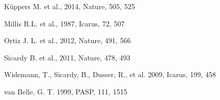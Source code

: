 \documentclass[useAMS,usenatbib]{mn2e}
\begin{document}
\begin{thebibliography}{99}
 K\"{u}ppers M. et al., 2014,
Nature, 505, 525

 Millis R.L. et al., 1987,
Icarus, 72, 507

 Ortiz J. L. et al., 2012,
Nature, 491, 566

 Sicardy B. et al., 2011,
Nature, 478, 493

 Widemann, T., Sicardy, B., Dusser, R., et al. 2009, Icarus, 199, 458

 van Belle, G. T. 1999, PASP, 111, 1515





















\end{thebibliography}
\end{document}
